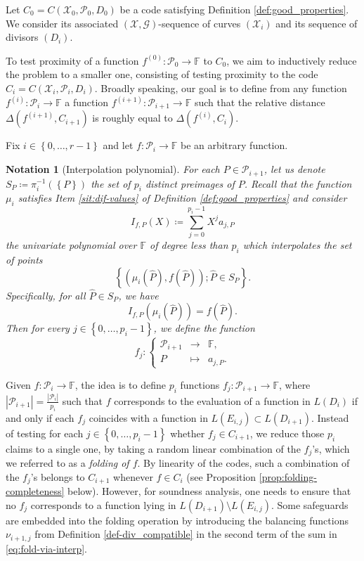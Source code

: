 \documentclass[a4paper,USenglish,autoref]{lipics-v2021}
\renewcommand\hat{\widehat}
\newcommand\F{\mathbb{F}}
\renewcommand{\hat}{\widehat}
\renewcommand{\vec}[1]{\boldsymbol{#1}}
\newcommand{\set}[1]{\left\{#1\right\}}
\newcommand{\size}[1]{\left|#1\right|}
\newcommand{\range}[1]{\set{0,\dots,#1-1}}
\newcommand\calX{\mathcal{X}}
\newcommand\calP{\mathcal{P}}
\newcommand\calG{\mathcal{G}}
\newcommand\XGseq{(\calX, \vec{\calG})}
\newcommand\mydef{\coloneqq}
\newtheorem{notation}{Notation}
\begin{document}
Let $C_0 = C(\calX_0,\calP_0,D_0)$ be a code satisfying Definition \ref{def:good_properties}. We consider its associated $\XGseq$-sequence of curves $(\calX_i)$ and its sequence of divisors $(D_i)$. 

To test proximity of a function ${f^{(0)} : \calP_0 \rightarrow \F}$ to $C_0$, we aim to inductively reduce the problem to a smaller one, consisting of testing proximity to the code $C_i = C(\calX_i,\calP_i,D_i)$. Broadly speaking, our goal is to define from any function $f^{(i)} : \calP_i \rightarrow \F$ a function $f^{(i+1)} : \calP_{i+1} \rightarrow \F$ such that the relative distance $\Delta(f^{(i+1)}, C_{i+1})$ is roughly equal to $\Delta(f^{(i)}, C_i)$.

Fix $i \in \range{r}$ and let $f : \calP_i \rightarrow \F$ be an arbitrary function. 

\begin{notation}[Interpolation polynomial]\label{not:IfP}
	For each $P \in \calP_{i+1}$, let us denote ${S_P \mydef \pi_i^{-1}(\set{P})}$ the set of $p_i$ distinct preimages of $P$.     Recall that the function $\mu_i$ satisfies Item \ref{sit:dif-values} of Definition \ref{def:good_properties} and consider 
	\begin{equation}\label{eq:IfP}
		I_{f,P}(X)\mydef\sum_{j=0}^{p_i-1} X^j a_{j,P} 
	\end{equation} 
	the univariate polynomial over $\F$ of degree less than $p_i$ which interpolates the set of points \[\set{(\mu_i(\hat P), f(\hat P)) ; \hat P \in S_P}.\] 
	Specifically, for all $\hat P \in S_P$, we have
	\[
	I_{f, P}(\mu_i(\hat P)) = f(\hat P).
	\]    
	Then for every $j \in \range{p_i}$, we define the function 
	\begin{equation}\label{eq:coeff-fj}
		f_j:\left\{\begin{array}{ccc}
			\calP_{i+1} &\rightarrow& \F, \\
			P &\mapsto & a_{j,P}.
		\end{array}\right.
	\end{equation}
\end{notation}

Given $f : \calP_i \rightarrow \F$, the idea is to define $p_i$ functions $f_j : \calP_{i+1} \rightarrow \F$, where $\size{\calP_{i+1}} = \frac{\size{\calP_i}}{p_{i}}$ such that $f$ corresponds to the evaluation of a function in $L(D_i)$ if and only if each $f_j$ coincides with a function in $L(E_{i, j}) \subset L(D_{i+1})$. Instead of testing for each $j \in \range{p_i}$ whether $f_j \in C_{i+1}$, we reduce those $p_i$ claims to a single one, by taking a random linear combination of the $f_j$'s, which we referred to as a \emph{folding of $f$}. By linearity of the codes, such a combination of the $f_j$'s belongs to $C_{i+1}$ whenever $f \in C_i$ (see Proposition \ref{prop:folding-completeness} below). However, for soundness analysis,  one needs to ensure that no $f_j$ corresponds to a function lying in $L(D_{i+1}) \setminus L(E_{i,j})$. Some safeguards are embedded into the folding operation by introducing the balancing functions $\nu_{i+1,j}$ from Definition \ref{def-div_compatible} in the second term of the sum in \eqref{eq:fold-via-interp}.
\end{document}
